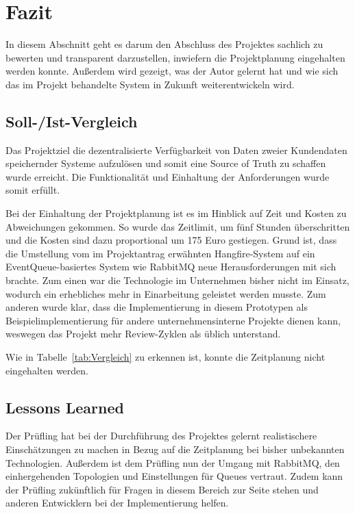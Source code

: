 \section{Fazit} 
\label{sec:Fazit}
In diesem Abschnitt geht es darum den Abschluss des Projektes sachlich zu bewerten und transparent darzustellen,
inwiefern die Projektplanung eingehalten werden konnte. Außerdem wird gezeigt, was der Autor gelernt hat und
wie sich das im Projekt behandelte System in Zukunft weiterentwickeln wird.


\subsection{Soll-/Ist-Vergleich}
\label{sec:SollIstVergleich}
Das Projektziel die dezentralisierte Verfügbarkeit von Daten zweier Kundendaten speichernder Systeme aufzulösen und 
somit eine Source of Truth zu schaffen wurde erreicht.
Die Funktionalität und Einhaltung der Anforderungen wurde somit erfüllt. 
\par\smallskip
Bei der Einhaltung der Projektplanung ist es im Hinblick auf Zeit und Kosten zu Abweichungen gekommen. 
So wurde das Zeitlimit, um fünf Stunden überschritten und die Kosten sind dazu proportional um 175 Euro gestiegen. 
Grund ist, dass die Umstellung vom im Projektantrag erwähnten Hangfire-System auf ein EventQueue-basiertes System 
wie RabbitMQ neue Herausforderungen mit sich brachte. Zum einen war die Technologie im Unternehmen bisher nicht im Einsatz, 
wodurch ein erhebliches mehr in Einarbeitung geleistet werden musste.
Zum anderen wurde klar, dass die Implementierung in diesem Prototypen als Beispielimplementierung für andere unternehmensinterne Projekte dienen kann,
weswegen das Projekt mehr Review-Zyklen als üblich unterstand. 
\par\smallskip
Wie in Tabelle~\ref{tab:Vergleich} zu erkennen ist, konnte die Zeitplanung nicht eingehalten werden.


\subsection{Lessons Learned}
\label{sec:LessonsLearned}
Der Prüfling hat bei der Durchführung des Projektes gelernt realistischere Einschätzungen zu machen in Bezug
auf die Zeitplanung bei bisher unbekannten Technologien.
Außerdem ist dem Prüfling nun der Umgang mit RabbitMQ, den einhergehenden Topologien und Einstellungen 
für Queues vertraut.
Zudem kann der Prüfling zukünftlich für Fragen in diesem Bereich zur Seite stehen und anderen Entwicklern bei der 
Implementierung helfen.  


